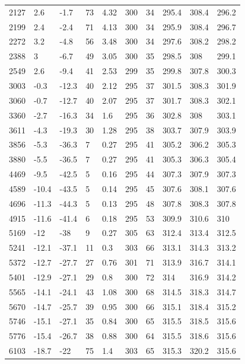\documentclass{article}
\begin{document}
{\begin{longtable}[h!]{p{}|p{}|p{}|p{}|p{}|p{}|p{}|p{}|p{}|p{}}
    2127 & 2.6 & -1.7 & 73 & 4.32 & 300 & 34 & 295.4 & 308.4 & 296.2 \\
    2199 & 2.4 & -2.4 & 71 & 4.13 & 300 & 34 & 295.9 & 308.4 & 296.7 \\
    2272 & 3.2 & -4.8 & 56 & 3.48 & 300 & 34 & 297.6 & 308.2 & 298.2 \\
    2388 & 3 & -6.7 & 49 & 3.05 & 300 & 35 & 298.5 & 308 & 299.1 \\
    2549 & 2.6 & -9.4 & 41 & 2.53 & 299 & 35 & 299.8 & 307.8 & 300.3 \\
    3003 & -0.3 & -12.3 & 40 & 2.12 & 295 & 37 & 301.5 & 308.3 & 301.9 \\
    3060 & -0.7 & -12.7 & 40 & 2.07 & 295 & 37 & 301.7 & 308.3 & 302.1 \\
    3360 & -2.7 & -16.3 & 34 & 1.6 & 295 & 36 & 302.8 & 308 & 303.1 \\
    3611 & -4.3 & -19.3 & 30 & 1.28 & 295 & 38 & 303.7 & 307.9 & 303.9 \\
    3856 & -5.3 & -36.3 & 7 & 0.27 & 295 & 41 & 305.2 & 306.2 & 305.3 \\
    3880 & -5.5 & -36.5 & 7 & 0.27 & 295 & 41 & 305.3 & 306.3 & 305.4 \\
    4469 & -9.5 & -42.5 & 5 & 0.16 & 295 & 44 & 307.3 & 307.9 & 307.3 \\
    4589 & -10.4 & -43.5 & 5 & 0.14 & 295 & 45 & 307.6 & 308.1 & 307.6 \\
    4696 & -11.3 & -44.3 & 5 & 0.13 & 295 & 48 & 307.8 & 308.3 & 307.8 \\
    4915 & -11.6 & -41.4 & 6 & 0.18 & 295 & 53 & 309.9 & 310.6 & 310 \\
    5169 & -12 & -38 & 9 & 0.27 & 305 & 63 & 312.4 & 313.4 & 312.5 \\
    5241 & -12.1 & -37.1 & 11 & 0.3 & 303 & 66 & 313.1 & 314.3 & 313.2 \\
    5372 & -12.7 & -27.7 & 27 & 0.76 & 301 & 71 & 313.9 & 316.7 & 314.1 \\
    5401 & -12.9 & -27.1 & 29 & 0.8 & 300 & 72 & 314 & 316.9 & 314.2 \\
    5565 & -14.1 & -24.1 & 43 & 1.08 & 300 & 68 & 314.5 & 318.3 & 314.7 \\
    5670 & -14.7 & -25.7 & 39 & 0.95 & 300 & 66 & 315.1 & 318.4 & 315.2 \\
    5746 & -15.1 & -27.1 & 35 & 0.84 & 300 & 65 & 315.5 & 318.5 & 315.6 \\
    5776 & -15.4 & -26.7 & 38 & 0.88 & 300 & 64 & 315.5 & 318.6 & 315.6 \\
    6103 & -18.7 & -22 & 75 & 1.4 & 303 & 65 & 315.3 & 320.2 & 315.6 \\

\end{longtable}}
\end{document}
